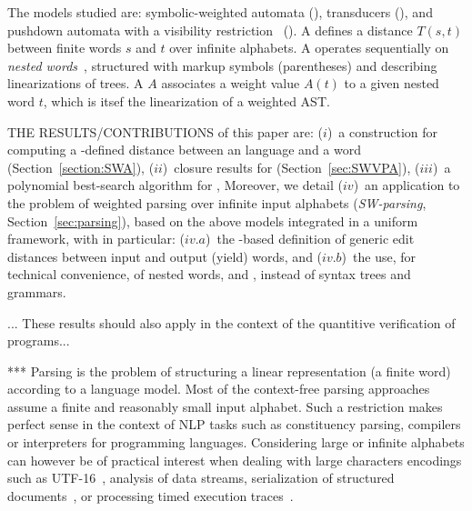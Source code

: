 The models studied are: 
symbolic-weighted automata (\SWA),
transducers (\SWT), and pushdown automata
with a visibility restriction~\cite{AlurMadhusudan09nested} (\SWVPA).
A \SWT defines a distance $T(s, t)$ between finite words $s$ and $t$
over infinite alphabets. %
A  \SWVPA operates sequentially on \emph{nested words}~\cite{AlurMadhusudan09nested},
structured with markup symbols (parentheses) and describing linearizations of trees.
A \SWVPA $A$ associates a weight value $A(t)$ %
to a given nested word $t$, which is itsef the linearization of a weighted AST. %




THE RESULTS/CONTRIBUTIONS of this paper are:
($i$)~a construction %
for computing a \SWT-defined distance between an \SWA language and a word (Section~\ref{section:SWA}), 
($ii$)~closure results for \SWVPA (Section~\ref{sec:SWVPA}), 
($iii$)~a polynomial best-search algorithm for \SWVPA, %
%
Moreover, we detail 
($iv$)~an application to the problem of weighted parsing over infinite input alphabets 
(\emph{SW-parsing}, Section~\ref{sec:parsing}), 
based on the above models integrated in a uniform framework, with in particular:
($iv.a$)~the \SWT-based definition of generic edit distances between input and output (yield) words,
and ($iv.b$)~the use, for technical convenience, of nested words, and \SWVPA,
instead of syntax trees and grammars. %

... These results should also apply in the context of the quantitive verification of programs...

***
Parsing is the problem of structuring a linear representation
(a finite word) according to a language model. %
%
Most of the context-free parsing approaches~\cite{GruneJacobs08parsing}
assume a finite and reasonably small input alphabet. %
Such a restriction makes perfect sense in the context of
NLP tasks such as constituency parsing, 
compilers or interpreters for programming languages.
Considering large or infinite alphabets can however be of
practical interest when dealing with large characters encodings such as UTF-16~\cite{dAntoni21CACM},
%
analysis of data streams, serialization of structured documents~\cite{Segoufin06csl,NevenSchwentickVianu04FSMinfinite},
or processing timed execution traces~\cite{Bouyer03algebraic}.

